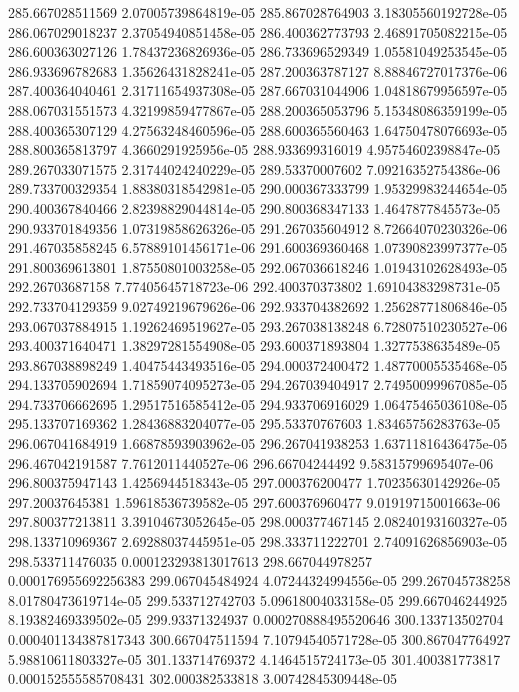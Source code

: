 {285.667028511569 2.07005739864819e-05
285.867028764903 3.18305560192728e-05
286.067029018237 2.37054940851458e-05
286.400362773793 2.46891705082215e-05
286.600363027126 1.78437236826936e-05
286.733696529349 1.05581049253545e-05
286.933696782683 1.35626431828241e-05
287.200363787127 8.88846727017376e-06
287.400364040461 2.31711654937308e-05
287.667031044906 1.04818679956597e-05
288.067031551573 4.32199859477867e-05
288.200365053796 5.15348086359199e-05
288.400365307129 4.27563248460596e-05
288.600365560463 1.64750478076693e-05
288.800365813797 4.3660291925956e-05
288.933699316019 4.95754602398847e-05
289.267033071575 2.31744024240229e-05
289.53370007602 7.09216352754386e-06
289.733700329354 1.88380318542981e-05
290.000367333799 1.95329983244654e-05
290.400367840466 2.82398829044814e-05
290.800368347133 1.4647877845573e-05
290.933701849356 1.07319858626326e-05
291.267035604912 8.72664070230326e-06
291.467035858245 6.57889101456171e-06
291.600369360468 1.07390823997377e-05
291.800369613801 1.87550801003258e-05
292.067036618246 1.01943102628493e-05
292.26703687158 7.77405645718723e-06
292.400370373802 1.69104383298731e-05
292.733704129359 9.02749219679626e-06
292.933704382692 1.25628771806846e-05
293.067037884915 1.19262469519627e-05
293.267038138248 6.72807510230527e-06
293.400371640471 1.38297281554908e-05
293.600371893804 1.3277538635489e-05
293.867038898249 1.40475443493516e-05
294.000372400472 1.48770005535468e-05
294.133705902694 1.71859074095273e-05
294.267039404917 2.74950099967085e-05
294.733706662695 1.29517516585412e-05
294.933706916029 1.06475465036108e-05
295.133707169362 1.28436883204077e-05
295.53370767603 1.83465756283763e-05
296.067041684919 1.66878593903962e-05
296.267041938253 1.63711816436475e-05
296.467042191587 7.7612011440527e-06
296.66704244492 9.58315799695407e-06
296.800375947143 1.4256944518343e-05
297.000376200477 1.70235630142926e-05
297.20037645381 1.59618536739582e-05
297.600376960477 9.01919715001663e-06
297.800377213811 3.39104673052645e-05
298.000377467145 2.08240193160327e-05
298.133710969367 2.69288037445951e-05
298.333711222701 2.74091626856903e-05
298.533711476035 0.000123293813017613
298.667044978257 0.000176955692256383
299.067045484924 4.07244324994556e-05
299.267045738258 8.01780473619714e-05
299.533712742703 5.09618004033158e-05
299.667046244925 8.19382469339502e-05
299.93371324937 0.000270888495520646
300.133713502704 0.000401134387817343
300.667047511594 7.10794540571728e-05
300.867047764927 5.98810611803327e-05
301.133714769372 4.1464515724173e-05
301.400381773817 0.000152555585708431
302.000382533818 3.00742845309448e-05
}
